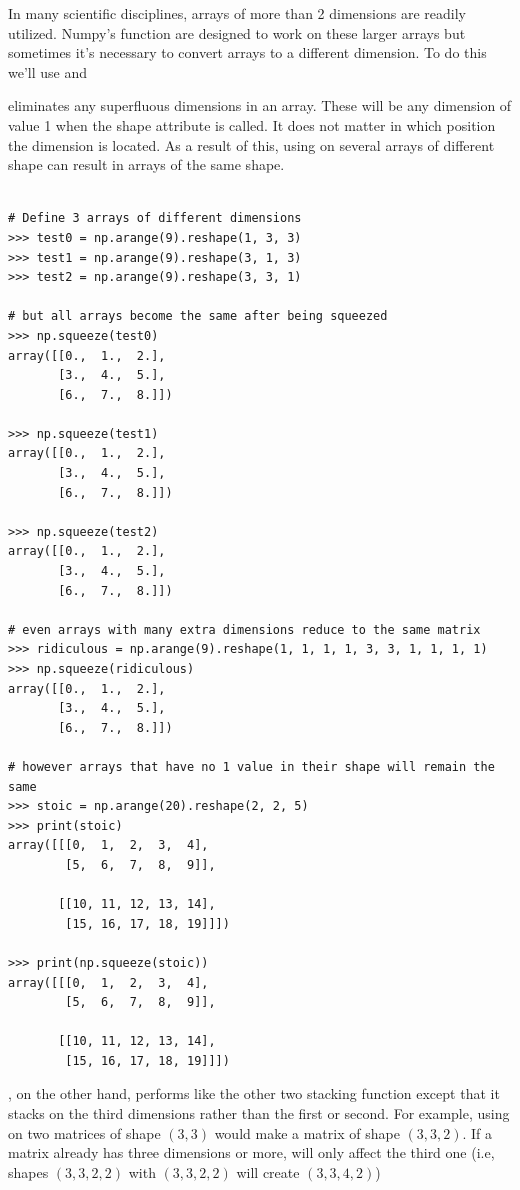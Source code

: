 In many scientific disciplines, arrays of more than 2 dimensions are readily utilized.
Numpy's function are designed to work on these larger arrays but sometimes it's necessary to convert arrays to a different dimension.
To do this we'll use  and 

 eliminates any superfluous dimensions in an array.
These will be any dimension of value 1 when the shape attribute is called.
It does not matter in which position the dimension is located.
As a result of this, using  on several arrays of different shape can result in arrays of the same shape.

\begin{lstlisting}

# Define 3 arrays of different dimensions
>>> test0 = np.arange(9).reshape(1, 3, 3)
>>> test1 = np.arange(9).reshape(3, 1, 3)
>>> test2 = np.arange(9).reshape(3, 3, 1)

# but all arrays become the same after being squeezed
>>> np.squeeze(test0)
array([[0.,  1.,  2.],
       [3.,  4.,  5.],
       [6.,  7.,  8.]])

>>> np.squeeze(test1)
array([[0.,  1.,  2.],
       [3.,  4.,  5.],
       [6.,  7.,  8.]])

>>> np.squeeze(test2)
array([[0.,  1.,  2.],
       [3.,  4.,  5.],
       [6.,  7.,  8.]])

# even arrays with many extra dimensions reduce to the same matrix
>>> ridiculous = np.arange(9).reshape(1, 1, 1, 1, 3, 3, 1, 1, 1, 1)
>>> np.squeeze(ridiculous)
array([[0.,  1.,  2.],
       [3.,  4.,  5.],
       [6.,  7.,  8.]])

# however arrays that have no 1 value in their shape will remain the same
>>> stoic = np.arange(20).reshape(2, 2, 5)
>>> print(stoic)
array([[[0,  1,  2,  3,  4],
        [5,  6,  7,  8,  9]],

       [[10, 11, 12, 13, 14],
        [15, 16, 17, 18, 19]]])

>>> print(np.squeeze(stoic))
array([[[0,  1,  2,  3,  4],
        [5,  6,  7,  8,  9]],

       [[10, 11, 12, 13, 14],
        [15, 16, 17, 18, 19]]])

\end{lstlisting}

, on the other hand, performs like the other two stacking function except that it stacks on the third dimensions rather than the first or second.
For example, using  on two matrices of shape $(3,3)$ would make a matrix of shape $(3,3,2)$. If a matrix already has three dimensions or more,  will only affect the third one (i.e, shapes $(3,3,2,2)$ with $(3,3,2,2)$ will create $(3,3,4,2)$)

